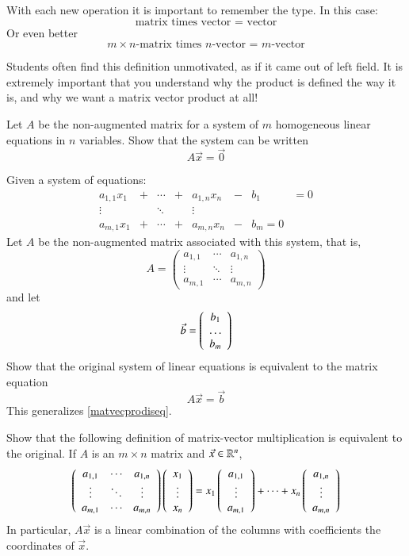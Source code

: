 \documentclass[Main.tex]{subfiles}
\begin{document}
\begin{Remark}
  With each new operation it is important to remember the type.
  In this case: 
  \[\mbox{matrix times vector = vector}\]
  Or even better
  \[\mbox{$m\times n$-matrix times $n$-vector = $m$-vector}\]
\end{Remark}
\begin{PedRemark}
  Students often find this definition unmotivated, as if it came out of left field.
  It is extremely important that you understand why the product is defined the way it is, and why we want a matrix vector product at all!
\end{PedRemark}
\begin{EasyEx}
  \label{matvecprodiseq}
  Let $A$ be the non-augmented matrix for a system of $m$ homogeneous linear equations in $n$ variables.  
  Show that the system can be written
  \[A\vec{x}=\vec{0}\]
\end{EasyEx}
\begin{EasyEx}
  Given a system of equations:
  \[\begin{array}{ccccccccc}
    a_{1,1}x_1 & + & \cdots & + & a_{1,n}x_n & - & b_1  & = 0\\
    \vdots     &   & \ddots &   & \vdots     \\
    a_{m,1}x_1 & + & \cdots & + & a_{m,n}x_n &  - & b_m= 0
  \end{array}\]
  Let $A$ be the non-augmented matrix associated with this system, that is, 
  \[A=\left(\begin{array}{cccc}
      a_{1,1} &  \cdots & a_{1,n}\\
      \vdots     & \ddots  & \vdots\\
      a_{m,1} & \cdots  & a_{m,n}
    \end{array}\right)\]
  and let
  \[\vec{b} = \left(\begin{array}{c}b_1\\\hdots\\b_m\end{array}\right)\]
  Show that the original system of linear equations is equivalent to the matrix equation
  \[A\vec{x}=\vec{b}\]
  This generalizes \ref{matvecprodiseq}.
\end{EasyEx}

\begin{Ex}
  \label{sec:othermatvecdef}
  Show that the following definition of matrix-vector multiplication is equivalent to the original.
  If $A$ is an $m\times n$ matrix  and $\vec{x}\in\mathbb{R}^n$, 
  \[\left(\begin{array}{cccc}
      a_{1,1} &  \cdots & a_{1,n}\\
      \vdots     & \ddots  & \vdots\\
      a_{m,1} & \cdots  & a_{m,n}
    \end{array}\right)\left(\begin{array}{c}x_1\\\vdots\\x_n\end{array}\right) =
  x_1\left(\begin{array}{c}a_{1,1}\\\vdots\\a_{m,1}\end{array}\right) + \cdots + x_n\left(\begin{array}{c}a_{1,n}\\\vdots\\a_{m,n}\end{array}\right)\]
  In particular, $A\vec{x}$ is a linear combination of the columns with coefficients the coordinates of $\vec{x}$.  
\end{Ex}
\end{document}
